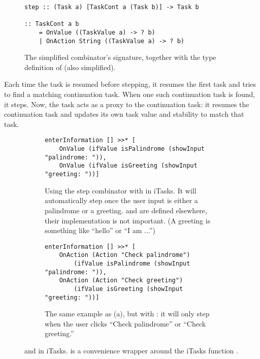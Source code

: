 \begin{figure}[ht]
\centering
\begin{verbatim}
step :: (Task a) [TaskCont a (Task b)] -> Task b

:: TaskCont a b
    = OnValue ((TaskValue a) -> ? b)
    | OnAction String ((TaskValue a) -> ? b)
\end{verbatim}
\caption{The simplified  combinator's signature, together with the type definition of  (also simplified).}
\label{lst:clean_step}
\end{figure}

Each time the  task is resumed before stepping, it resumes the first task and tries to find a matching continuation task. When one such continuation task is found, it steps. Now, the  task acts as a proxy to the continuation task: it resumes the continuation task and updates its own task value and stability to match that task.

\begin{figure}[ht]
\begin{subfigure}{\textwidth}
\centering
\begin{verbatim}
enterInformation [] >>* [
    OnValue (ifValue isPalindrome (showInput "palindrome: ")),
    OnValue (ifValue isGreeting (showInput "greeting: "))]
\end{verbatim}
\caption{Using the step combinator with  in iTasks. It will automatically step once the user input is either a palindrome or a greeting.  and  are defined elsewhere, their implementation is not important. (A greeting is something like ``hello'' or ``I am ...'')}
\label{lst:clean_step_onvalue}
\end{subfigure}
\begin{subfigure}{\textwidth}
\centering
\bigskip
\begin{verbatim}
enterInformation [] >>* [
    OnAction (Action "Check palindrome")
        (ifValue isPalindrome (showInput "palindrome: ")),
    OnAction (Action "Check greeting")
        (ifValue isGreeting (showInput "greeting: "))]
\end{verbatim}
\caption{The same example as (a), but with : it will only step when the user clicks ``Check palindrome'' or ``Check greeting.''}
\label{lst:clean_step_onaction}
\end{subfigure}
\caption{ and  in iTasks.  is a convenience wrapper around the iTasks function .}
\label{lst:clean_step_onvalue_onaction}
\end{figure}

